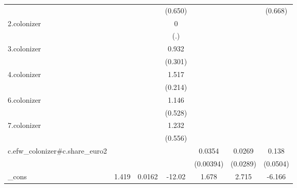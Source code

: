 {\begin{tabular}{l*{6}{c}}
            &                     &                     &     (0.650)         &                     &                     &     (0.668)         \\
[1em]
2.colonizer &                     &                     &           0         &                     &                     &                     \\
            &                     &                     &         (.)         &                     &                     &                     \\
[1em]
3.colonizer &                     &                     &       0.932\sym{**} &                     &                     &                     \\
            &                     &                     &     (0.301)         &                     &                     &                     \\
[1em]
4.colonizer &                     &                     &       1.517\sym{***}&                     &                     &                     \\
            &                     &                     &     (0.214)         &                     &                     &                     \\
[1em]
6.colonizer &                     &                     &       1.146\sym{*}  &                     &                     &                     \\
            &                     &                     &     (0.528)         &                     &                     &                     \\
[1em]
7.colonizer &                     &                     &       1.232\sym{*}  &                     &                     &                     \\
            &                     &                     &     (0.556)         &                     &                     &                     \\
[1em]
c.efw\_colonizer#c.share\_euro2&                     &                     &                     &      0.0354\sym{***}&      0.0269         &       0.138\sym{*}  \\
            &                     &                     &                     &   (0.00394)         &    (0.0289)         &    (0.0504)         \\
[1em]
\_cons      &       1.419         &      0.0162         &      -12.02\sym{*}  &       1.678\sym{*}  &       2.715\sym{*}  &      -6.166         \\

\end{tabular}}
